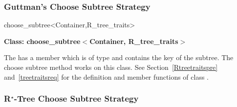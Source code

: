 \subsubsection{Guttman's Choose Subtree Strategy}

\begin{ccClassTemplate}{choose_subtree<Container,R_tree_traits>}

\noindent
{\bf Class: choose\_subtree$<$Container, R\_tree\_traits$>$}

\ccDefinition
The  has a member
 which is of
type  and contains the key of the subtree.
The choose subtree method works
on this class. 
See Section~\ref{Rtreetraitspre} and~\ref{treetraitsreq} for the definition and member
functions of class .


\ccCreation
{}

\ccOperations


\end{ccClassTemplate}

\subsubsection{R$^\star$-Tree Choose Subtree Strategy}

